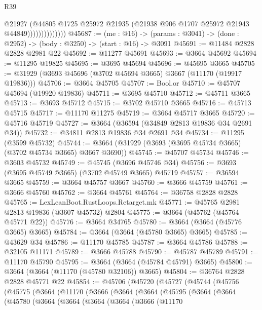 \begin{lexlean}{R39}
\begin{coremodule}
                            @21927
                            (@44805
                              @1725
                              @25972
                              @21935
                              (@21938 @906 @1707 @25972 @21943 @44849))))))))))))))
@45687 := (me : @16) ->
  (params : @3041) -> (done : @2952) -> (body : @3250) -> (start : @16) -> @3091
@45691 := @11484 @2828 @2828 @2981 @22
@45692 := @11277 @45691
@45693 := @3664 @45692
@45694 := @11295 @19825
@45695 := @3695 @45694
@45696 := @45695 @3665
@45705 := @31929 (@3693 @45696 (@3702 @45694 @3665) @3667 (@11170 (@19917 @19836)))
@45706 := @3664 @45705
@45707 := Bool.or
@45710 := @45707 @45694 (@19920 @19836)
@45711 := @3695 @45710
@45712 := @45711 @3665
@45713 := @3693 @45712
@45715 := @3702 @45710 @3665
@45716 := @45713 @45715
@45717 := @11170 @11275
@45719 := @3664 @45717 @3665
@45720 := @45716 @45719
@45727 := @3664 (@36594 (@34849 @2813 @19836 @34 @2691 @34))
@45732 := @34811 @2813 @19836 @34 @2691 @34
@45734 := @11295 (@3599 @45732)
@45744 := @3664 (@31929 (@3693 (@3695 @45734 @3665) (@3702 @45734 @3665) @3667 @3690))
@45745 := @45707 @45734
@45746 := @3603 @45732
@45749 := @45745 (@3696 @45746 @34)
@45756 := @3693 (@3695 @45749 @3665) (@3702 @45749 @3665) @45719
@45757 := @36594 @3665
@45759 := @3664 @45757 @3667
@45760 := @3666 @45759
@45761 := @3666 @45760
@45762 := @3664 @45761
@45764 := @36758 @2828 @2828
@45765 := LexLeanBoot.RustLoops.Retarget.mk
@45771 := @45765 @2981 @2813 @19836 (@3607 @45732) @2804
@45775 := @3664 (@45762 (@45764 @45771 @22))
@45776 := @3664 @34765
@45780 := @3664 (@3664 (@45776 @3665) @3665)
@45784 := @3664 (@3664 (@45780 @3665) @3665)
@45785 := @43629 @34
@45786 := @11170 @45785
@45787 := @3664 @45786
@45788 := @32105 @11171
@45789 := @3666 @45788
@45790 := @45787 @45789
@45791 := @11170 @45790
@45795 := @3664 (@3664 (@45784 @45791) @3665)
@45800 := @3664 (@3664 (@11170 (@45780 @32106)) @3665)
@45804 := @36764 @2828 @2828 @45771 @22
@45854 := @45706
    (@45720
      (@45727
        (@45744
          (@45756
            (@45775
              (@3664
                (@11170
                  (@3666
                    (@3664
                      (@3664
                        (@45795
                          (@3664
                            (@3664
                              (@45780
                                (@3664
                                  (@3664
                                    (@3664
                                      (@3664
                                        (@3666
                                          (@11170

\end{coremodule}
\end{lexlean}
